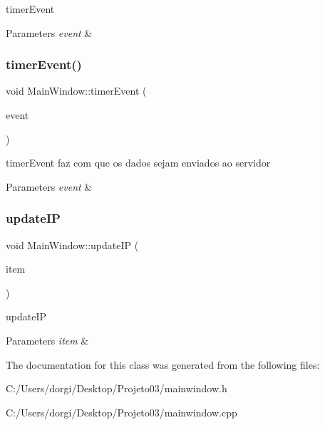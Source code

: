 timer\+Event 


\begin{DoxyParams}{Parameters}
{\em event} & \\
\hline
\end{DoxyParams}
\mbox{\label{class_main_window_aaa425b1554af3c1f58cc70b4815082ae}} 
\subsubsection{\texorpdfstring{timer\+Event()}{timerEvent()}\hspace{0.1cm}{\footnotesize\ttfamily [2/2]}}
{\footnotesize\ttfamily void Main\+Window\+::timer\+Event (\begin{DoxyParamCaption}\item[{Q\+Timer\+Event $\ast$}]{event }\end{DoxyParamCaption})}



timer\+Event faz com que os dados sejam enviados ao servidor 


\begin{DoxyParams}{Parameters}
{\em event} & \\
\hline
\end{DoxyParams}
\mbox{\label{class_main_window_a288baaab0a21fb3b372f2da4307c1ff6}} 
\subsubsection{\texorpdfstring{update\+IP}{updateIP}}
{\footnotesize\ttfamily void Main\+Window\+::update\+IP (\begin{DoxyParamCaption}\item[{Q\+List\+Widget\+Item $\ast$}]{item }\end{DoxyParamCaption})\hspace{0.3cm}{\ttfamily [slot]}}



update\+IP 


\begin{DoxyParams}{Parameters}
{\em item} & \\
\hline
\end{DoxyParams}


The documentation for this class was generated from the following files\+:\begin{DoxyCompactItemize}
\item 
C\+:/\+Users/dorgi/\+Desktop/\+Projeto03/mainwindow.\+h\item 
C\+:/\+Users/dorgi/\+Desktop/\+Projeto03/mainwindow.\+cpp\end{DoxyCompactItemize}
